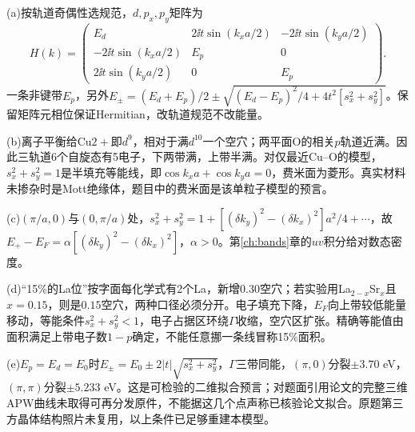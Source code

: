 \begin{solution}
(a)按轨道奇偶性选规范，$d,p_x,p_y$矩阵为
\begin{equation}
H(k)=\begin{pmatrix}E_d&2\ii t\sin(k_xa/2)&-2\ii t\sin(k_ya/2)\\-2\ii t\sin(k_xa/2)&E_p&0\\2\ii t\sin(k_ya/2)&0&E_p\end{pmatrix}.
\end{equation}
一条非键带$E_p$，另外$E_\pm=(E_d+E_p)/2\pm\sqrt{(E_d-E_p)^2/4+4t^2[s_x^2+s_y^2]}$。保留矩阵元相位保证Hermitian，改轨道规范不改能量。

(b)离子平衡给Cu$2+$即$d^9$，相对于满$d^{10}$一个空穴；两平面O的相关$p$轨道近满。因此三轨道6个自旋态有5电子，下两带满，上带半满。对仅最近Cu--O的模型，$s_x^2+s_y^2=1$是半填充等能线，即$\cos k_xa+\cos k_ya=0$，费米面为菱形。真实材料未掺杂时是Mott绝缘体，题目中的费米面是该单粒子模型的预言。

(c)$(\pi/a,0)$与$(0,\pi/a)$处，$s_x^2+s_y^2=1+[(\delta k_y)^2-(\delta k_x)^2]a^2/4+\cdots$，故$E_+-E_F=\alpha[(\delta k_y)^2-(\delta k_x)^2]$，$\alpha>0$。第\ref{ch:bands}章的$uv$积分给对数态密度。

(d)“15\%的La位”按字面每化学式有2个La，新增$0.30$空穴；若实验用La$_{2-x}$Sr$_x$且$x=0.15$，则是$0.15$空穴，两种口径必须分开。电子填充下降，$E_F$向上带较低能量移动，等能条件$s_x^2+s_y^2<1$，电子占据区环绕$\Gamma$收缩，空穴区扩张。精确等能值由面积满足上带电子数$1-p$确定，不能任意挪一条线冒称15\%面积。

(e)$E_p=E_d=E_0$时$E_\pm=E_0\pm2|t|\sqrt{s_x^2+s_y^2}$，$\Gamma$三带同能，$(\pi,0)$分裂$\pm3.70$ eV，$(\pi,\pi)$分裂$\pm5.233$ eV。这是可检验的二维拟合预言；对题面引用论文的完整三维APW曲线未取得可再分发原件，不能据这几个点声称已核验论文拟合。原题第三方晶体结构照片未复用，以上条件已足够重建本模型。
\end{solution}


